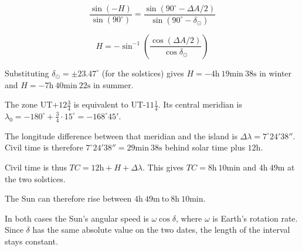 \documentclass[11pt]{article}
\begin{document}
\begin{pproblem}
\begin{pssolution*}{}{}
\begin{alternativas}
        \[\frac{\sin(- H)}{\sin (90^\circ)} = \frac{\sin(90^\circ - \Delta A/2)}{\sin(90^\circ-\delta_\odot)}\]

        \[H = -\sin^{-1}\left(\frac{\cos(\Delta A/2)}{\cos\delta_\odot}\right)\]

        Substituting \(\delta_\odot = \pm 23.47^\circ\) (for the solstices) gives \(H = -4\text{h} \ 19\text{min} \ 38\text{s}\) in winter and \(H = -7\text{h} \ 40\text{min} \ 22\text{s}\) in summer.
        
        The zone UT+\(12\frac{3}{4}\) is equivalent to UT-\(11\frac{1}{4}\). Its central meridian is \(\lambda_0 = -180^\circ +\frac{3}{4}\cdot 15^\circ = -168^\circ 45'\).
        
        The longitude difference between that meridian and the island is \(\Delta \lambda = 7^\circ 24'38''\). Civil time is therefore \(7^\circ 24'38'' = 29\text{min} \ 38\text{s}\) behind solar time plus \(12\text{h}\).

        Civil time is thus \(TC = 12\text{h} + H + \Delta \lambda\). This gives \(TC = 8\text{h} \ 10\text{min}\) and \(4\text{h} \ 49\text{m}\) at the two solstices.

        The Sun can therefore rise between \(\boxed{4\text{h} \ 49\text{m} \ \text{to} \ 8\text{h} \ 10\text{min}}\).

        \item In both cases the Sun's angular speed is \(\omega\cos\delta\), where \(\omega\) is Earth's rotation rate. Since \(\delta\) has the same absolute value on the two dates, the length of the interval stays constant.
    \end{alternativas}
\end{pssolution*}
\end{pproblem}
\end{document}
